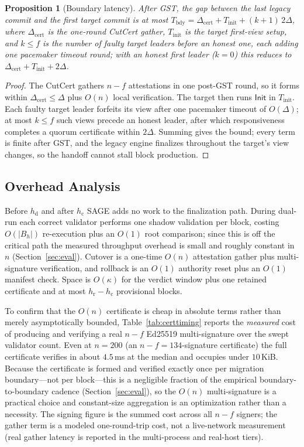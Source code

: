 \documentclass[journal]{IEEEtran}
\newtheorem{proposition}{Proposition}
\theoremstyle{definition}
\theoremstyle{remark}
\begin{document}
\begin{proposition}[Boundary latency]
\label{prop:bdy}
After GST, the gap between the last legacy commit and the first target commit is at most
$T_{\mathrm{bdy}} = \Delta_{\mathrm{cert}} + T_{\mathrm{init}} + (k{+}1)\,2\Delta$, where
$\Delta_{\mathrm{cert}}$ is the one-round CutCert gather, $T_{\mathrm{init}}$ is the target
first-view setup, and $k\le f$ is the number of faulty target leaders before an honest one,
each adding one pacemaker timeout round; with an honest first leader ($k{=}0$) this reduces to
$\Delta_{\mathrm{cert}} + T_{\mathrm{init}} + 2\Delta$.
\end{proposition}
\begin{proof}
The CutCert gathers $n-f$ attestations in one post-GST round, so it forms within
$\Delta_{\mathrm{cert}}\le\Delta$ plus $O(n)$ local verification. The target then runs
$\mathsf{Init}$ in $T_{\mathrm{init}}$. Each faulty target leader forfeits its view after one
pacemaker timeout of $O(\Delta)$; at most $k\le f$ such views precede an honest leader, after
which responsiveness completes a quorum certificate within $2\Delta$. Summing gives the bound;
every term is finite after GST, and the legacy engine finalizes throughout the target's view
changes, so the handoff cannot stall block production.
\end{proof}

\subsection{Overhead Analysis}
Before $h_{\mathrm{d}}$ and after $h_{\mathrm{c}}$ SAGE adds no work to the finalization path.
During dual-run each correct validator performs one shadow validation per block, costing
$O(|B_h|)$ re-execution plus an $O(1)$ root comparison; since this is off the critical path the
measured throughput overhead is small and roughly constant in $n$ (Section~\ref{sec:eval}).
Cutover is a one-time $O(n)$ attestation gather plus multi-signature verification, and rollback is an
$O(1)$ authority reset plus an $O(1)$ manifest check. Space is $O(\kappa)$ for the verdict window
plus one retained certificate and at most $h_{\mathrm{r}}-h_{\mathrm{c}}$ provisional blocks.

To confirm that the $O(n)$ certificate is cheap in absolute terms rather than merely
asymptotically bounded, Table~\ref{tab:certtiming} reports the \emph{measured} cost of
producing and verifying a real $n{-}f$ Ed25519 multi-signature over the swept validator count.
Even at $n{=}200$ (an $n{-}f{=}134$-signature certificate) the full certificate verifies in
about $4.5\,$ms at the median and occupies under $10\,$KiB. Because the certificate is formed and
verified exactly once per migration boundary---not per block---this is a negligible fraction of
the empirical boundary-to-boundary cadence (Section~\ref{sec:eval}), so the $O(n)$ multi-signature
is a practical choice and constant-size aggregation is an optimization rather than a necessity.
The signing figure is the summed cost across all $n{-}f$ signers; the gather term is a modeled
one-round-trip cost, not a live-network measurement (real gather latency is reported in the
multi-process and real-host tiers).
\end{document}
